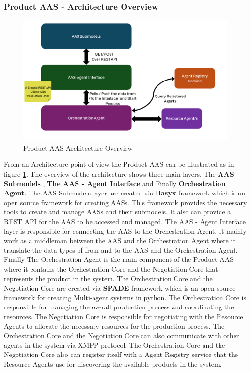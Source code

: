\newpage
\subsubsection{Product AAS - Architecture Overview }

\begin{figure}[h]
    \centering
    \includegraphics[width=0.99\textwidth]{Images/Production_Agent_Arch_overview.png}
    \caption{Product AAS Architecture Overview}
    \label{fig:product_aas_architecture_overview}
\end{figure}

From an Architecture point of view the Product AAS can be illustrated as in figure \ref{fig:product_aas_architecture_overview}.
The overview of the architecture shows three main layers, The \textbf{AAS Submodels} , \textbf{The AAS - Agent Interface} and Finally  \textbf{Orchestration Agent}.
The AAS Submodels layer are created via \textbf{Basyx} framework which is an open source framework for creating AASs.
This framework provides the necessary tools to create and manage AASs and their submodels.
It also can provide a REST API for the AAS to be accessed and managed.
The AAS - Agent Interface layer is responsible for connecting the AAS to the Orchestration Agent.
It mainly work as a middleman between the AAS and the Orchestration Agent where it translate the data types of from and to the AAS and the Orchestration Agent.
Finally The Orchestration Agent is the main component of the Product AAS where it contains the Orchestration Core and the Negotiation Core that represents the product in the system.
The Orchestration Core and the Negotiation Core are created via \textbf{SPADE} framework which is an open source framework for creating Multi-agent systems in python.
The Orchestration Core is responsible for managing the overall production process and coordinating the resources.
The Negotiation Core is responsible for negotiating with the Resource Agents to allocate the necessary resources for the production process.
The Orchestration Core and the Negotiation Core can also communicate with other agents in the system via XMPP protocol.
The Orchestration Core and the Negotiation Core also can register itself with a Agent Registry service that the Resource Agents
use for discovering the available products in the system.

